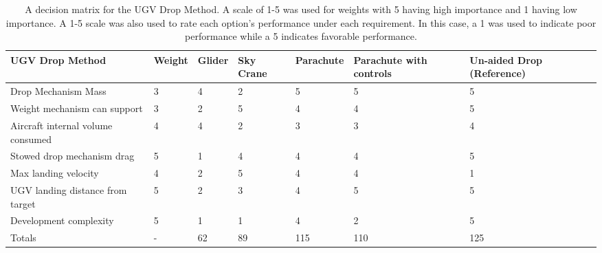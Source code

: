 \documentclass[]{auvsi_doc}
\begin{document}
\begin{table} [H]
\caption{A decision matrix for the UGV Drop Method. A scale of 1-5 was used for weights with 5 having high importance and 1 having low importance. A 1-5 scale was also used to rate each option’s performance under each requirement. In this case, a 1 was used to indicate poor performance while a 5 indicates favorable performance.}
\label{cont_cs_tab}
	\begin{tabular}{|>{\raggedright}p{2.5cm}| l | l | l | l | p{2.5cm} | p{2.5cm} |}
\hline

UGV Drop Method&Weight&Glider&Sky Crane& Parachute& Parachute with controls& Un-aided Drop (Reference) \\
\hline
Drop Mechanism Mass&                                3&4&2&5&5&5 \\
\hline
Weight mechanism can support&                       3&2&5&4&4&5 \\
\hline
Aircraft internal volume consumed&                  4&4&2&3&3&4 \\
\hline
Stowed drop mechanism drag&                         5&1&4&4&4&5 \\
\hline
Max landing velocity&                               4&2&5&4&4&1 \\
\hline
UGV landing distance from target&                   5&2&3&4&5&5 \\
\hline
Development complexity&                             5&1&1&4&2&5 \\
\hline
Totals&                                             -&62&89&115&110&125 \\
\hline

\end{tabular}
\end{table}
\end{document}
